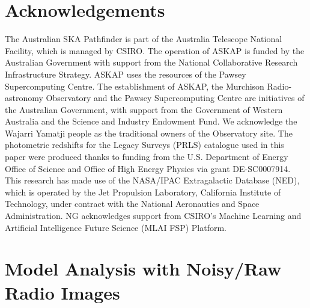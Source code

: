 \documentclass[
  journal=pasa,
  manuscript=research-paper, %
  year=2020,
  volume=37,
]{cup-journal}
\begin{document}
\section*{Acknowledgements}
The Australian SKA Pathfinder is part of the Australia Telescope National Facility, which is managed by CSIRO. The operation of ASKAP is funded by the Australian Government with support from the National Collaborative Research Infrastructure Strategy. ASKAP uses the resources of the Pawsey Supercomputing Centre. The establishment of ASKAP, the Murchison Radio-astronomy Observatory and the Pawsey Supercomputing Centre are initiatives of the Australian Government, with support from the Government of Western Australia and the Science and Industry Endowment Fund. We acknowledge the Wajarri Yamatji people as the traditional owners of the Observatory site.
The photometric redshifts for the Legacy Surveys (PRLS) catalogue used in this paper were produced thanks to funding from the U.S. Department of Energy Office of Science and Office of High Energy Physics via grant DE-SC0007914.
This research has made use of the NASA/IPAC Extragalactic Database (NED), which is operated by the Jet Propulsion Laboratory, California Institute of Technology, under contract with the National Aeronautics and Space Administration.
NG acknowledges support from CSIRO’s Machine Learning and Artificial Intelligence Future Science (MLAI FSP) Platform.



\appendix

\section{Model Analysis with Noisy/Raw Radio Images}
\label{SEC:Noisy}
\end{document}
